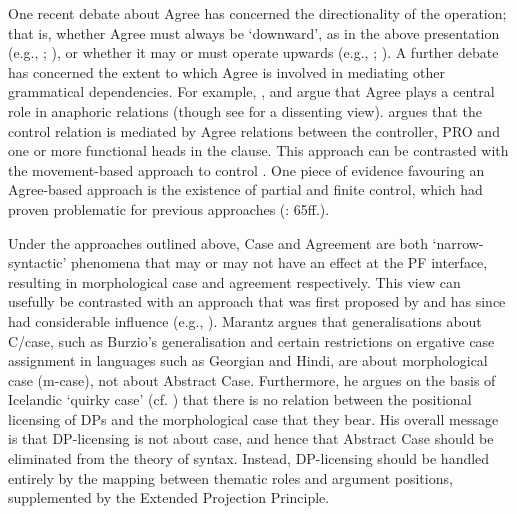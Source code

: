 \documentclass[output=paper]{langsci/langscibook}
\begin{document}
One recent debate about Agree has concerned the directionality of the operation; that is, whether Agree must always be ‘downward’, as in the above presentation (e.g., \citealt{Chomsky2000,Chomsky2001Derivation}; \citealt{Preminger2013}), or whether it may or must operate upwards (e.g., \citealt{Zeijlstra2012}; \citealt{Ackema2018}). A further debate has concerned the extent to which Agree is involved in mediating other grammatical dependencies. For example, \citet{Reuland2001}, \citet{Hicks2009} and \citet{Rooryck2011} argue that Agree plays a central role in anaphoric relations (though see \citealt{Safir2014} for a dissenting view). \citet{Landau2000} argues that the control relation is mediated by Agree relations between the controller, PRO and one or more functional heads in the clause. This approach can be contrasted with the movement-based approach to control \citep{Hornstein1999,Hornstein2010}. One piece of evidence favouring an Agree-based approach is the existence of partial and finite control, which had proven problematic for previous approaches (\citealt{Landau2013}: 65ff.).

Under the approaches outlined above, Case and Agreement are both ‘narrow-syntactic’ phenomena that may or may not have an effect at the PF interface, resulting in morphological case and agreement respectively. This view can usefully be contrasted with an approach that was first proposed by \citet{Marantz1991} and has since had considerable influence (e.g., \citealt{Harley1995,Schütze1997,McFadden2004,Bobaljik2008Phi,Baker2010,Titov2012}). Marantz argues that generalisations about C/case, such as Burzio’s generalisation \citep{Burzio1986} and certain restrictions on ergative case assignment in languages such as Georgian and Hindi, are about morphological case (m-case), not about Abstract Case. Furthermore, he argues on the basis of Icelandic ‘quirky case’ (cf. \citealt{Zaenen1985}) that there is no relation between the positional licensing of DPs and the morphological case that they bear. His overall message is that DP-licensing is not about case, and hence that Abstract Case should be eliminated from the theory of syntax. Instead, DP-licensing should be handled entirely by the mapping between thematic roles and argument positions, supplemented by the Extended Projection Principle.
\end{document}
